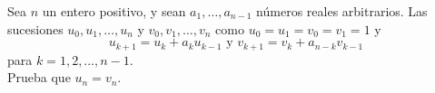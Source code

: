 \documentclass[11pt]{scrartcl}
\begin{document}
\begin{problem}
    Sea $n$ un entero positivo, y sean $a_1, \ldots, a_{n-1}$ números reales arbitrarios.
    Las sucesiones $u_0, u_1, \ldots , u_n$ y $v_0, v_1, \ldots, v_n$ como $u_0=u_1=v_0=v_1=1$ y 
    \[u_{k+1}=u_k+a_ku_{k-1} \text{ y } v_{k+1}=v_k+a_{n-k}v_{k-1}\]
    para $k=1,2,\ldots, n-1$. \\
    Prueba que $u_n=v_n$.
\end{problem}
\end{document}
